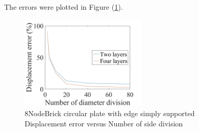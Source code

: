 \documentclass[fleqn,11pt,letter]{article}
\begin{document}

The errors were plotted in Figure (\ref{fig 8NodeBrick circular plate with four edge simply supported}).

\begin{figure}[H]
    \centering
    \includegraphics[width=6cm]{../Figure_files/8NodeBrick/error8brick_circular_plate_simply_supported.jpeg}
  \captionsetup{justification=centering,margin=3cm}
  \caption{8NodeBrick circular plate with edge simply supported\\
      Displacement error   versus   Number of side division}
  \label{fig 8NodeBrick circular plate with four edge simply supported}
\end{figure}
\end{document}

